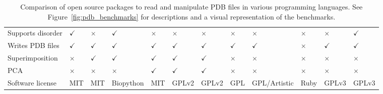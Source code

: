 \begin{table}
\begin{footnotesize}
\begin{tabular}{ l p{1.2cm} p{1.2cm} p{1.5cm} p{1.2cm} p{1.7cm} p{1.2cm} p{1.2cm} p{1.2cm} p{1.2cm} p{1.2cm} p{1.2cm} }
Supports disorder     & $\checkmark$ & $\times$     & $\checkmark$ & $\times$     & $\times$     & $\times$     & $\times$     & $\times$      & $\times$     & $\times$      & $\checkmark$ \\
Writes PDB files      & $\checkmark$ & $\checkmark$ & $\checkmark$ & $\checkmark$ & $\checkmark$ & $\checkmark$ & $\checkmark$ & $\checkmark$  & $\times$     & $\checkmark$  & $\checkmark$ \\
Superimposition       & $\times$     & $\checkmark$ & $\checkmark$ & $\checkmark$ & $\checkmark$ & $\checkmark$ & $\times$     & $\times$      & $\times$     & $\times$      & $\times$     \\
PCA                   & $\times$     & $\times$     & $\times$     & $\checkmark$ & $\checkmark$ & $\checkmark$ & $\times$     & $\times$      & $\times$     & $\times$      & $\times$     \\
Software license      & MIT          & MIT          & Biopython    & MIT          & GPLv2        & GPLv2        & GPL          & GPL/\newline Artistic  & Ruby         & GPLv3         & GPLv3        \\
\hline
\end{tabular}
\end{footnotesize}

\caption[Comparison of open source packages to read and manipulate PDB files in various programming languages]
{Comparison of open source packages to read and manipulate PDB files in various programming languages.
See Figure~\ref{fig:pdb_benchmarks} for descriptions and a visual representation of the benchmarks.}

\label{tab:package_comparison}
\end{table}


